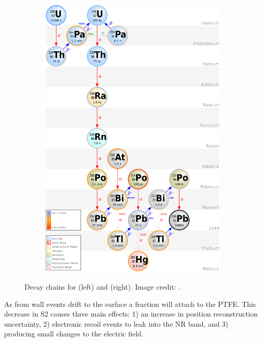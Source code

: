 \begin{figure}
\begin{subfigure}[t]{0.5\textwidth}
    \end{subfigure}%
    \begin{subfigure}[t]{0.5\textwidth}
        \centering
        \includegraphics[width=\textwidth]{Decay_Chain_of_Uranium-238}
    \end{subfigure}
    \caption{Decay chains for  (left) and  (right).  Image credit: .}
	\label{fig:backgrounds_decay_chains}
\end{figure}

As \electron from wall events drift to the surface a fraction will attach to the PTFE.  This decrease in S2 causes three main effects: 1)
an increase in position reconstruction uncertainty, 2) electronic recoil events to leak into the NR band, and 3) producing small changes
to the electric field.

